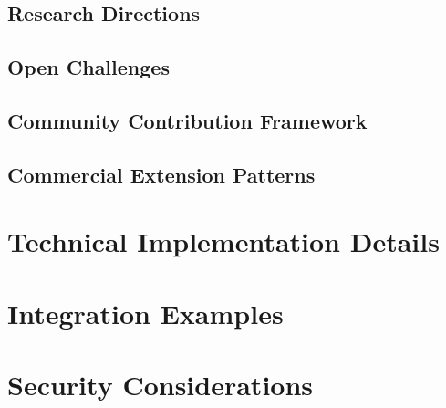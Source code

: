 \documentclass[11pt]{article}
\begin{document}
\subsection{Research Directions}
\subsection{Open Challenges}
\subsection{Community Contribution Framework}
\subsection{Commercial Extension Patterns}




\appendix
\section{Technical Implementation Details}
\section{Integration Examples}
\section{Security Considerations}
\end{document}
